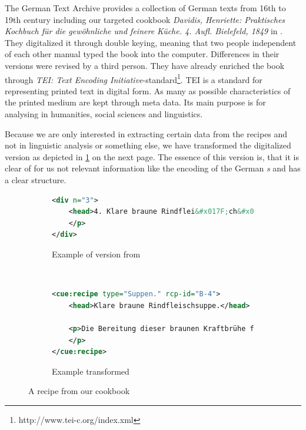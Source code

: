 \documentclass[12pt, twoside]{report}
\newcommand*\longs{{\fontencoding{TS1}\selectfont s}}
\begin{document}
The German Text Archive provides a collection of German texts from 16th to 19th century including our targeted cookbook \textit{Davidis, Henriette: Praktisches Kochbuch für die gewöhnliche und feinere Küche. 4. Aufl. Bielefeld, 1849} in \parencite{DTA}. They digitalized it through double keying, meaning that two people independent of each other manual typed the book into the computer. Differences in their versions were revised by a third person. They have already enriched the book through \textit{TEI: Text Encoding Initiative}-standard\footnote{http://www.tei-c.org/index.xml}. TEI is a standard for representing printed text in digital form. As many as possible characteristics of the printed medium are kept through meta data. Its main purpose is for analysing in humanities, social sciences and linguistics.

Because we are only interested in extracting certain data from the recipes and not in linguistic analysis or something else, we have transformed the digitalized version as depicted in \cref{fig:davidisRecipe} on the next page. The essence of this version is, that it is clear of for us not relevant information like the encoding of the German \textit{\longs} and has a clear structure. 

\begin{figure}
	\begin{subfigure}{1\textwidth}
	\begin{lstlisting}[language=XML]
<div n="3">
	<head>4. Klare braune Rindflei&#x017F;ch&#x017F;uppe.</head> <lb/> <p>Die Bereitung die&#x017F;er braunen Kraftbrühe findet man in<lb/> <hi rendition="#aq">A.</hi> No. 12. Zu einer Ge&#x017F;ell&#x017F;chaft	von 12 Per&#x017F;onen nimmt<lb/> man 6 Pfund Rindflei&#x017F;ch und 1 Pfund rohen Schinken. Es<lb/> werden braune Klöße No. 3 und Schwammklöße darin gemacht.<lb/> Auch kann man nach Belieben braunen Sago darin kochen.
	</p>
</div>
	\end{lstlisting}
		\caption{Example of version from \parencite{DTA}}
	\end{subfigure} \\
	\begin{subfigure}{1\textwidth}
\begin{lstlisting}[language=XML]
<cue:recipe type="Suppen." rcp-id="B-4">
	<head>Klare braune Rindfleischsuppe.</head>
	
	<p>Die Bereitung dieser braunen Kraftbrühe findet man in A. No. 12. Zu einer Gesellschaft von 12 Personen nimmt man 6 Pfund Rindfleisch und 1 Pfund rohen Schinken. Es werden braune Klöße No. 3 und Schwammklöße darin gemacht. Auch kann man nach Belieben braunen Sago darin kochen.
	</p>
</cue:recipe>
\end{lstlisting}
		\caption{Example transformed}
	\end{subfigure}
	\caption{A recipe from our cookbook}
	\label{fig:davidisRecipe}
\end{figure}
\end{document}
